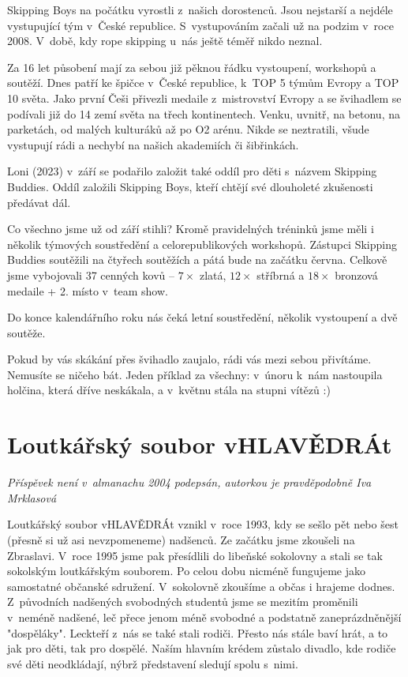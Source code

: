 \documentclass[a5paper, 11pt, twoside]{article}
\begin{document}
Skipping Boys na počátku vyrostli z~našich dorostenců. Jsou nejstarší a
nejdéle vystupující tým v~České republice. S~vystupováním začali už na
podzim v~roce 2008. V~době, kdy rope skipping u~nás ještě téměř nikdo
neznal.

Za 16 let působení mají za sebou již pěknou řádku vystoupení, workshopů
a soutěží. Dnes patří ke špičce v~České republice, k~TOP 5 týmům Evropy
a TOP 10 světa. Jako první Češi přivezli medaile z~mistrovství Evropy a
se švihadlem se podívali již do 14 zemí světa na třech kontinentech.
Venku, uvnitř, na betonu, na parketách, od malých kulturáků až po O2
arénu. Nikde se neztratili, všude vystupují rádi a nechybí na našich
akademiích či šibřinkách.

Loni (2023) v~září se podařilo založit také oddíl pro děti s~názvem
Skipping Buddies. Oddíl založili Skipping Boys, kteří chtějí své
dlouholeté zkušenosti předávat dál.

Co všechno jsme už od září stihli? Kromě pravidelných tréninků jsme měli
i několik týmových soustředění a celorepublikových workshopů. Zástupci
Skipping Buddies soutěžili na čtyřech soutěžích a pátá bude na začátku
června. Celkově jsme vybojovali 37 cenných kovů -- \(7\times\) zlatá, \(12\times\)
stříbrná a \(18\times\) bronzová medaile + 2. místo v~team show.

Do konce kalendářního roku nás čeká letní soustředění, několik
vystoupení a dvě soutěže.

Pokud by vás skákání přes švihadlo zaujalo, rádi vás mezi sebou
přivítáme. Nemusíte se ničeho bát. Jeden příklad za všechny: v~únoru
k~nám nastoupila holčina, která dříve neskákala, a v~květnu stála na
stupni vítězů :)

\section{Loutkářský soubor vHLAVĚDRÁt}

\begin{center}
  \textit{Příspěvek není v~almanachu 2004 podepsán, autorkou je
  pravděpodobně Iva Mrklasová}
\end{center}

Loutkářský soubor vHLAVĚDRÁt vznikl v~roce 1993, kdy se sešlo pět nebo
šest (přesně si už asi nevzpomeneme) nadšenců. Ze začátku jsme zkoušeli
na Zbraslavi. V~roce 1995 jsme pak přesídlili do libeňské sokolovny a
stali se tak sokolským loutkářským souborem. Po celou dobu nicméně
fungujeme jako samostatné občanské sdružení. V~sokolovně zkoušíme a
občas i hrajeme dodnes. Z~původních nadšených svobodných studentů jsme
se mezitím proměnili v~neméně nadšené, leč přece jenom méně svobodné a
podstatně zaneprázdněnější "dospěláky". Leckteří z~nás se také stali
rodiči. Přesto nás stále baví hrát, a to jak pro děti, tak pro dospělé.
Naším hlavním krédem zůstalo divadlo, kde rodiče své děti neodkládají,
nýbrž představení sledují spolu s~nimi.
\end{document}
